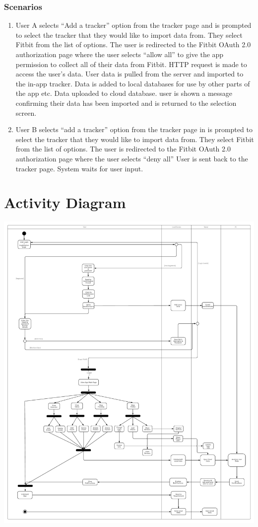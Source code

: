 \documentclass[a4paper,11pt]{article} %
\begin{document}
\subsubsection*{Scenarios}
\begin{enumerate}
    \item User A selects “Add a tracker” option from the tracker page and is prompted to select the tracker that they would like to import data from. They select Fitbit from the list of options. The user is redirected to the Fitbit OAuth 2.0 authorization page where the user selects “allow all” to give the app permission to collect all of their data from Fitbit. HTTP request is made to access the user’s data. User data is pulled from the server and imported to the in-app tracker. Data is added to local databases for use by other parts of the app etc. Data uploaded to cloud database. user is shown a message confirming their data has been imported and is returned to the selection screen.
    \item User B selects “add a tracker” option from the tracker page in is prompted to select the tracker that they would like to import data from. They select Fitbit from the list of options. The user is redirected to the Fitbit OAuth 2.0 authorization page where the user selects “deny all” User is sent back to the tracker page. System waits for user input.
\end{enumerate}
\newpage

\section{Activity Diagram}
\begin{center}
\includegraphics[width=\textwidth]{img/Activity_Diagram.pdf}
\end{center}
\newpage
\end{document}
